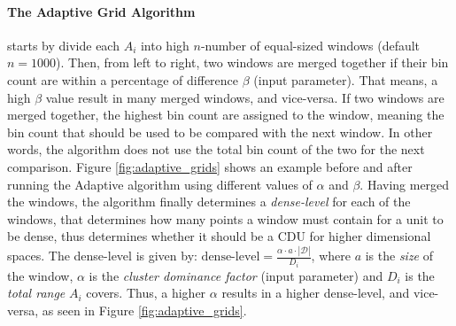 \paragraph{The Adaptive Grid Algorithm}
starts by divide each $A_i$ into high $n$-number of equal-sized windows (default $n = 1000$). Then, from left to right, two windows are merged together if their bin count are within a percentage of difference $\beta$ (input parameter). That means, a high $\beta$ value result in many merged windows, and vice-versa. If two windows are merged together, the highest bin count are assigned to the window, meaning the bin count that should be used to be compared with the next window. In other words, the algorithm does not use the total bin count of the two for the next comparison. Figure \ref{fig:adaptive_grids} shows an example before and after running the Adaptive algorithm using different values of $\alpha$ and $\beta$. Having merged the windows, the algorithm finally determines a \textit{dense-level} for each of the windows, that determines how many points a window must contain for a unit to be dense, thus determines whether it should be a CDU for higher dimensional spaces. The dense-level is given by: $\text{dense-level} = \frac{\alpha \cdot a\cdot |\mathcal{D}|}{D_i}$, where $a$ is the \textit{size} of the window, $\alpha$ is the \textit{cluster dominance factor} (input parameter) and $D_i$ is the \textit{total range} $A_i$ covers. Thus, a higher $\alpha$ results in a higher dense-level, and vice-versa, as seen in Figure \ref{fig:adaptive_grids}.

